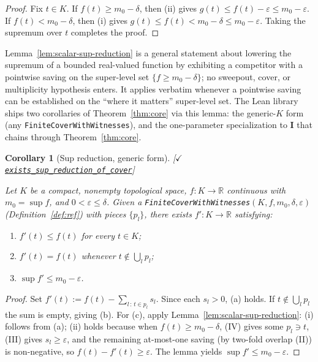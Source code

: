 \documentclass[11pt,reqno]{amsart}
\newtheorem{corollary}[theorem]{Corollary}
\theoremstyle{definition}
\newcommand{\unit}{\mathbf{I}}
\newcommand{\leanrepo}{https://github.com/MathNetwork/comb_arg/blob/v0.1.0/CombArg}
\newcommand{\leanmargin}[2]{%
  \nopagebreak\hfill{\normalfont\small\color{leangreen}%
    [\ensuremath{\checkmark}\,\href{\leanrepo/#2}{\texttt{#1}}]}\par\nopagebreak
}
\begin{document}
\begin{proof}
Fix $t \in K$. If $f(t) \ge m_0 - \delta$, then (ii) gives
$g(t) \le f(t) - \varepsilon \le m_0 - \varepsilon$. If
$f(t) < m_0 - \delta$, then (i) gives $g(t) \le f(t) <
m_0 - \delta \le m_0 - \varepsilon$. Taking the supremum over
$t$ completes the proof.
\end{proof}

Lemma~\ref{lem:scalar-sup-reduction} is a general statement
about lowering the supremum of a bounded real-valued function by
exhibiting a competitor with a pointwise saving on the
super-level set $\{f \ge m_0 - \delta\}$; no sweepout, cover, or
multiplicity hypothesis enters. It applies verbatim whenever a
pointwise saving can be established on the ``where it matters''
super-level set. The Lean library ships two corollaries of
Theorem~\ref{thm:core} via this lemma: the generic-$K$ form (any
\texttt{FiniteCoverWithWitnesses}), and the one-parameter
specialization to $\unit$ that chains through
Theorem~\ref{thm:core}.

\begin{corollary}[Sup reduction, generic form]
\label{cor:core-sup}
\leanmargin{exists\_sup\_reduction\_of\_cover}{Core.lean}
Let $K$ be a compact, nonempty topological space,
$f : K \to \mathbb{R}$ continuous with $m_0 = \sup f$, and
$0 < \varepsilon \le \delta$. Given a
\texttt{FiniteCoverWithWitnesses}$(K, f, m_0, \delta, \varepsilon)$
(Definition~\ref{def:ref}) with pieces $\{p_l\}$, there exists
$f' : K \to \mathbb{R}$ satisfying:
\begin{enumerate}
\item[\textup{(a)}] $f'(t) \le f(t)$ for every $t \in K$;
\item[\textup{(b)}] $f'(t) = f(t)$ whenever $t \notin \bigcup_l p_l$;
\item[\textup{(c)}] $\sup f' \le m_0 - \varepsilon$.
\end{enumerate}
\end{corollary}

\begin{proof}
Set $f'(t) := f(t) - \sum_{l \,:\, t \in p_l} s_l$. Since each
$s_l > 0$, (a) holds. If $t \notin \bigcup_l p_l$ the sum is
empty, giving (b). For (c), apply
Lemma~\ref{lem:scalar-sup-reduction}: (i) follows from (a);
(ii) holds because when $f(t) \ge m_0 - \delta$, (IV) gives
some $p_l \ni t$, (III) gives $s_l \ge \varepsilon$, and the
remaining at-most-one saving (by two-fold overlap (II)) is
non-negative, so $f(t) - f'(t) \ge \varepsilon$. The lemma
yields $\sup f' \le m_0 - \varepsilon$.
\end{proof}
\end{document}
